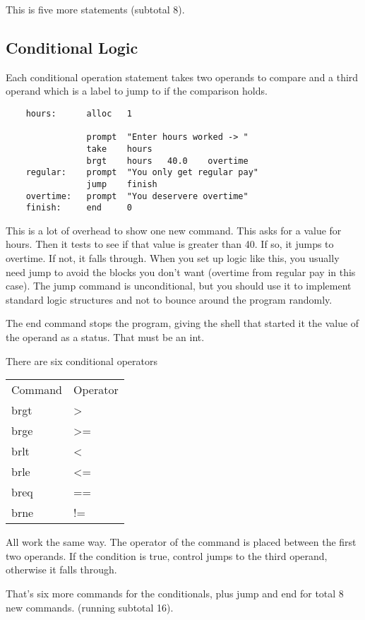 This is five more statements (subtotal 8).

\subsection{Conditional Logic}

Each conditional operation statement takes two operands to compare
and a third operand which is a label to jump to if the comparison holds.

{\footnotesize
\begin{verbatim}
    hours:      alloc   1

                prompt  "Enter hours worked -> "
                take    hours
                brgt    hours   40.0    overtime
    regular:    prompt  "You only get regular pay"
                jump    finish
    overtime:   prompt  "You deservere overtime"
    finish:     end     0
\end{verbatim}
}

This is a lot of overhead to show one new command. This asks for a value
for hours. Then it tests to see if that value is greater than 40.
If so, it jumps to overtime. If not, it falls through.
When you set up logic like this, you usually need jump to avoid the
blocks you don't want (overtime from regular pay in this case).
The jump command is unconditional, but you should use it to implement
standard logic structures and not to bounce around the program randomly.

The end command stops the program, giving the shell that started it the
value of the operand as a status. That must be an int.

There are six conditional operators

\begin{tabular}{l l}
    Command &   Operator \\
    brgt    &   > \\
    brge    &   >= \\
    brlt    &   < \\
    brle    &   <= \\
    breq    &   == \\
    brne    &   != \\
\end{tabular}

All work the same way. The operator of the command is placed between
the first two operands. If the condition is true, control jumps to
the third operand, otherwise it falls through.

That's six more commands for the conditionals, plus jump and end for
total 8 new commands. (running subtotal 16).

